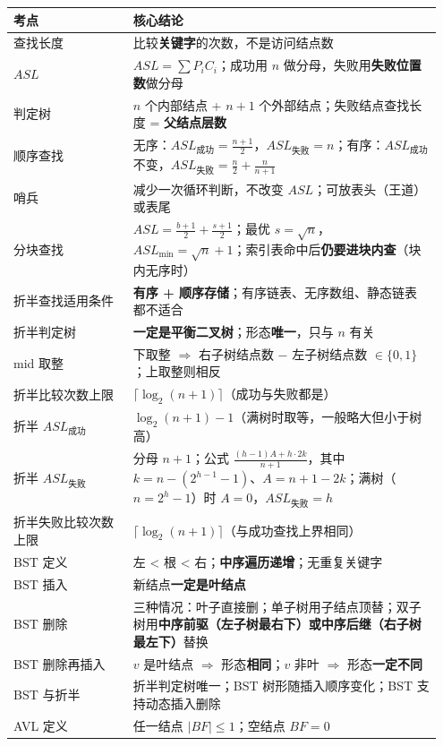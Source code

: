 \documentclass[11pt,openany,UTF8]{ctexbook}
\begin{document}
\begingroup\small\setlength{\tabcolsep}{4.0pt}
\begin{longtable}{@{}L{0.2664\linewidth}L{0.6793\linewidth}@{}}
\toprule
\textbf{考点} & \textbf{核心结论} \\
\midrule
\endhead
查找长度 & 比较\textbf{关键字}的次数，不是访问结点数 \\
$ASL$ & $ASL=\sum P_iC_i$；成功用 $n$ 做分母，失败用\textbf{失败位置数}做分母 \\
判定树 & $n$ 个内部结点 + $n+1$ 个外部结点；失败结点查找长度 = \textbf{父结点层数} \\
顺序查找 & 无序：$ASL_{成功}=\frac{n+1}{2}$，$ASL_{失败}=n$；有序：$ASL_{成功}$ 不变，$ASL_{失败}=\frac{n}{2}+\frac{n}{n+1}$ \\
哨兵 & 减少一次循环判断，不改变 $ASL$；可放表头（王道）或表尾 \\
分块查找 & $ASL=\frac{b+1}{2}+\frac{s+1}{2}$；最优 $s=\sqrt n$，$ASL_{\min}=\sqrt n+1$；索引表命中后\textbf{仍要进块内查}（块内无序时） \\
折半查找适用条件 & \textbf{有序 + 顺序存储}；有序链表、无序数组、静态链表都不适合 \\
折半判定树 & \textbf{一定是平衡二叉树}；形态\textbf{唯一}，只与 $n$ 有关 \\
mid 取整 & 下取整 $\Rightarrow$ 右子树结点数 $-$ 左子树结点数 $\in\{0,1\}$；上取整则相反 \\
折半比较次数上限 & $\lceil\log_2(n+1)\rceil$（成功与失败都是） \\
折半 $ASL_{成功}$ & $\log_2(n+1)-1$（满树时取等，一般略大但小于树高） \\
折半 $ASL_{失败}$ & 分母 $n+1$；公式 $\frac{(h-1)A+h\cdot 2k}{n+1}$，其中 $k=n-(2^{h-1}-1)$、$A=n+1-2k$；满树（$n=2^h-1$）时 $A=0$，$ASL_{失败}=h$ \\
折半失败比较次数上限 & $\lceil\log_2(n+1)\rceil$（与成功查找上界相同） \\
BST 定义 & 左 < 根 < 右；\textbf{中序遍历递增}；无重复关键字 \\
BST 插入 & 新结点\textbf{一定是叶结点} \\
BST 删除 & 三种情况：叶子直接删；单子树用子结点顶替；双子树用\textbf{中序前驱（左子树最右下）或中序后继（右子树最左下）}替换 \\
BST 删除再插入 & $v$ 是叶结点 $\Rightarrow$ 形态\textbf{相同}；$v$ 非叶 $\Rightarrow$ 形态\textbf{一定不同} \\
BST 与折半 & 折半判定树唯一；BST 树形随插入顺序变化；BST 支持动态插入删除 \\
AVL 定义 & 任一结点 $\lvert BF\rvert\le1$；空结点 $BF=0$ \\

\end{longtable}
\end{document}
